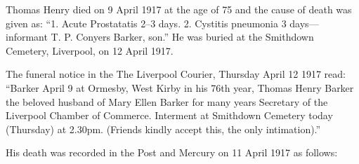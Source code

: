 Thomas Henry died on 9 April 1917 at the age of 75\cite{THBdeathcert} and the cause of death was given as: ``1. Acute Prostatatis 2--3 days. 2. Cystitis pneumonia 3 days---informant T. P. Conyers Barker, son.''  He was buried at the Smithdown Cemetery, Liverpool, on 12 April 1917.\cite{ToxtethBarker20}

The funeral notice in the The Liverpool Courier, Thursday April 12 1917 read:
``Barker April 9 at Ormesby, West Kirby in his 76th year, Thomas Henry Barker the beloved husband of Mary Ellen Barker for many years Secretary of the Liverpool Chamber of Commerce. Interment at Smithdown Cemetery today (Thursday) at 2.30pm. (Friends kindly accept this, the only intimation).''

His death was recorded in the Post and Mercury on 11 April 1917 as follows:

